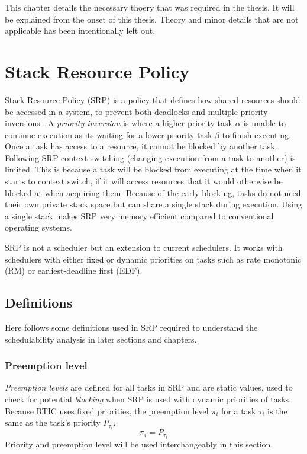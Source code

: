This chapter details the necessary thoery that was required in the thesis.
It will be explained from the onset of this thesis. Theory and minor details
that are not applicable has been intentionally left out.

\section{Stack Resource Policy}
\label{theory:srp}
Stack Resource Policy (SRP) is a policy that defines how shared resources
should be accessed in a system, to prevent both deadlocks and multiple priority
inversions \cite{srp}. A \emph{priority inversion} is where a higher priority
task $\alpha$ is unable to continue execution as its waiting for a lower
priority task $\beta$ to finish executing. Once a task has access to a
resource, it cannot be blocked by another task. Following SRP context
switching (changing execution from a task to another) is limited. This is
because a task will be blocked from executing at the time when it starts to
context switch, if it will access resources that it would otherwise be blocked
at when acquiring them. Because of the early blocking, tasks do not need their
own private stack space but can share a single stack during execution. Using a
single stack makes SRP very memory efficient compared to conventional operating
systems\cite{hardrealtimecomputingsystems}.

SRP is not a scheduler but an extension to current schedulers. It works with
schedulers with either fixed or dynamic priorities on tasks such as rate
monotonic (RM) or earliest-deadline first (EDF).

\subsection{Definitions}
\label{theory:srp:definitions}
Here follows some definitions used in SRP required to understand the
schedulability analysis in later sections and chapters.

\subsubsection{Preemption level}
\label{theory:srp:definitions:preemption}
\emph{Preemption levels} are defined for all tasks in SRP and are static
values, used to check for potential \emph{blocking} when SRP is used with
dynamic priorities of tasks.  Because RTIC uses fixed priorities, the
preemption level $\pi_i$ for a task $\tau_i$ is the same as the task's priority
$P_{\tau_i}$.
\begin{equation}
    \pi_i = P_{\tau_i}
\end{equation}
Priority and preemption level will be used interchangeably in this section.

